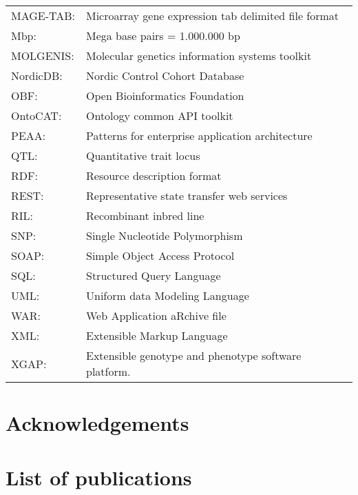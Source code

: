 \documentclass[8pt, twoside, a5paper]{report}
\begin{document}
\begin{tabular}{ l l }
MAGE-TAB:    & Microarray gene expression tab delimited file format\\
Mbp:         & Mega base pairs = 1.000.000 bp \\
MOLGENIS:    & Molecular genetics information systems toolkit\\
NordicDB:    & Nordic Control Cohort Database\\
OBF:         & Open Bioinformatics Foundation\\
OntoCAT:     & Ontology common API toolkit\\
PEAA:        & Patterns for enterprise application architecture\\
QTL:         & Quantitative trait locus\\
RDF:         & Resource description format\\
REST:        & Representative state transfer web services\\
RIL:         & Recombinant inbred line \\
SNP:         & Single Nucleotide Polymorphism\\
SOAP:        & Simple Object Access Protocol\\
SQL:         & Structured Query Language\\
UML:         & Uniform data Modeling Language\\
WAR:         & Web Application aRchive file\\
XML:         & Extensible Markup Language\\
XGAP:        & Extensible genotype and phenotype software platform. 
\end{tabular}

\newpage

\section*{Acknowledgements}
\lipsum[1]

\newpage

\section*{List of publications}
\end{document}
